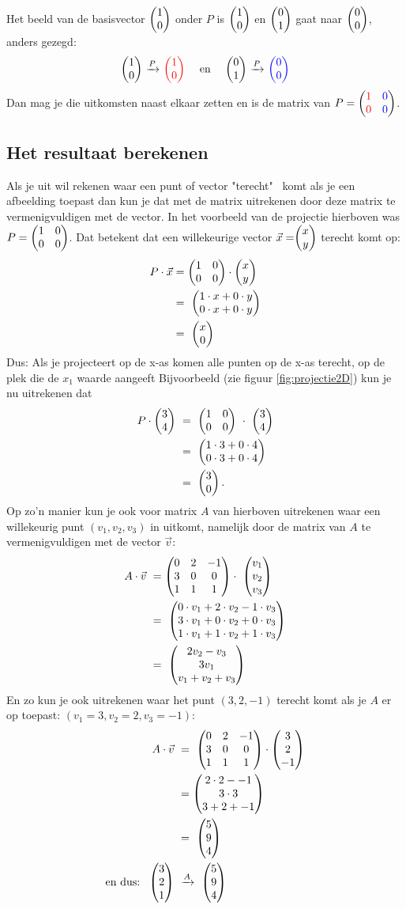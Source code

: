 Het beeld van de basisvector $\vectwee{1}{0} $ onder $P$ is $\vectwee{1}{0} $ en $\vectwee{0}{1} $ gaat naar $ \vectwee{0}{0} $, anders gezegd:
\[ 
    \vectwee{1}{0} \ \xrightarrow{P} \ \vectwee[red]{1}{0} \quad \text{ en } \quad 
    \vectwee{0}{1} \ \xrightarrow{P} \ \vectwee[blue]{0}{0} 
\]
Dan mag je die uitkomsten naast elkaar zetten en is de matrix van $P = \begin{pmatrix} {\color{red}1}&{\color{blue}0} \\ {\color{red}0}&{\color{blue}0} \end{pmatrix}$.

\subsection{Het resultaat berekenen}
Als je uit wil rekenen waar een punt of vector "terecht" \ komt als je een afbeelding toepast dan kun je dat met de matrix uitrekenen door deze matrix te vermenigvuldigen met de vector. In het voorbeeld van de projectie hierboven was $P = \begin{pmatrix} 1&0 \\ 0&0 \end{pmatrix} $. Dat betekent dat een willekeurige vector $\vec{x} = \vectwee{x}{y} $  terecht komt op: 
\begin{align*}
    P\cdot \vec{x} &= \begin{pmatrix} 1&0 \\ 0&0 \end{pmatrix} \cdot \begin{pmatrix} x \\ y \end{pmatrix} \\
    &= \ \begin{pmatrix} 1\cdot x + 0\cdot y \\ 0\cdot x + 0\cdot y \end{pmatrix}  \\
    &= \ \begin{pmatrix} x \\ 0 \end{pmatrix}  
\end{align*}
Dus: Als je projecteert op de x-as komen alle punten  op de x-as terecht, op de plek die de $ x_1 $ waarde aangeeft Bijvoorbeeld (zie figuur \ref{fig:projectie2D}) kun je nu uitrekenen dat
\begin{align*}
    P \cdot \mattwee{3}{4} \ &=\ \mattwee{1&0}{0&0} \ \cdot\ \mattwee{3}{4} \\
    &=\ \mattwee{1\cdot 3 + 0\cdot 4}{0\cdot 3 + 0\cdot 4} \\
    &=\ \mattwee{3}{0}.  
\end{align*}
Op zo'n manier kun je ook voor  matrix $A$ van hierboven uitrekenen waar een willekeurig punt $(v_1, v_2, v_3)$ in \RD uitkomt, namelijk door de matrix van $A$ te vermenigvuldigen met de vector $\vec{v}$:
\begin{align*}
    A\cdot \vec{v}\ &=\matdrie{0&2&-1}{3&0&0}{1&1&1} \cdot\ \matdrie{v_1}{v_2}{v_3} \\
                    &=\ \matdrie{0\cdot v_1 + 2\cdot v_2 - 1\cdot v_3}
                    {3\cdot v_1 + 0\cdot v_2 + 0\cdot v_3}
                    {1\cdot v_1 + 1\cdot v_2 + 1\cdot v_3}  \\
                    &=\ \matdrie{2v_2 - v_3}{3v_1}{v_1 + v_2 + v_3} 
\end{align*}
En zo kun je ook  uitrekenen waar het punt $(3,2,-1)$ terecht komt als je $A$ er op toepast: $(v_1 = 3, v_2 = 2 ,  v_3=-1 )$: 
\begin{align*}
    A\cdot \vec{v}\ &=\ \matdrie{0&2&-1}{3&0&0}{1&1&1} \cdot  \matdrie{3}{2}{-1} \\
                    &= \matdrie{2\cdot 2 - -1}{3\cdot 3}{3 + 2 + -1}  \\
                    &=\ \matdrie{5}{9}{4} \\
    \text{en dus:} \ \ \matdrie{3}{2}{1}\ & \xrightarrow{A}\ \matdrie{5}{9}{4}
\end{align*}


